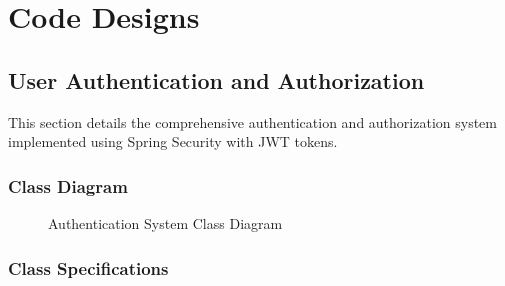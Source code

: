 \documentclass[12pt,a4paper]{article}
\begin{document}
\section{Code Designs}

\subsection{User Authentication and Authorization}

This section details the comprehensive authentication and authorization system implemented using Spring Security with JWT tokens.

\subsubsection{Class Diagram}

\begin{figure}[H]
\centering
{}
\caption{Authentication System Class Diagram}
\label{fig:auth-class-diagram}
\end{figure}

\subsubsection{Class Specifications}
\end{document}
